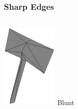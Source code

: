 \begin{frame}\frametitle{Sharp Edges}
	\begin{columns}
		\begin{column}[b]{0.22\textwidth}
			\begin{center}
				\includegraphics[width=\textwidth]{./img/2_mesh/bluntAxeMesh.png}
				\small{Blunt}
			\end{center}	
		\end{column}
		\begin{column}[b]{0.22\textwidth}
			\begin{center}

\end{center}
\end{column}
\end{columns}
\end{frame}

